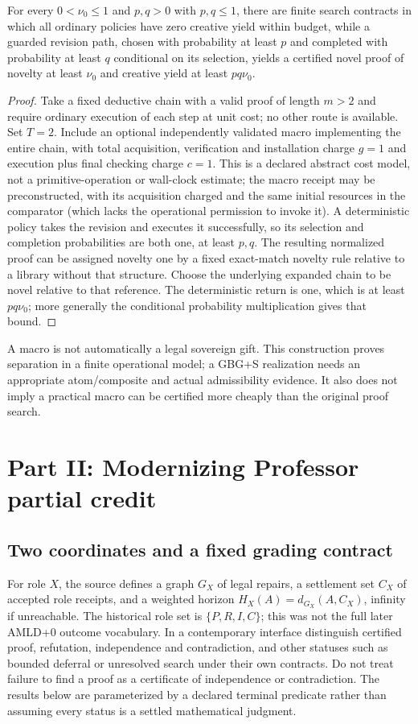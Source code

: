 \documentclass[11pt]{article}
\theoremstyle{definition}\newtheorem{definition}[theorem]{Definition}\newtheorem{conjecture}[theorem]{Conjecture}\newtheorem{example}[theorem]{Example}
\begin{document}
\begin{proposition}
For every $0<\nu_0\le1$ and $p,q>0$ with $p,q\le1$, there are finite search contracts in which all ordinary policies have zero creative yield within budget, while a guarded revision path, chosen with probability at least $p$ and completed with probability at least $q$ conditional on its selection, yields a certified novel proof of novelty at least $\nu_0$ and creative yield at least $pq\nu_0$.
\end{proposition}
\begin{proof}Take a fixed deductive chain with a valid proof of length $m>2$ and require ordinary execution of each step at unit cost; no other route is available. Set $T=2$. Include an optional independently validated macro implementing the entire chain, with total acquisition, verification and installation charge $g=1$ and execution plus final checking charge $c=1$. This is a declared abstract cost model, not a primitive-operation or wall-clock estimate; the macro receipt may be preconstructed, with its acquisition charged and the same initial resources in the comparator (which lacks the operational permission to invoke it). A deterministic policy takes the revision and executes it successfully, so its selection and completion probabilities are both one, at least $p,q$. The resulting normalized proof can be assigned novelty one by a fixed exact-match novelty rule relative to a library without that structure. Choose the underlying expanded chain to be novel relative to that reference. The deterministic return is one, which is at least $pq\nu_0$; more generally the conditional probability multiplication gives that bound.\end{proof}
A macro is not automatically a legal sovereign gift. This construction proves separation in a finite operational model; a GBG+S realization needs an appropriate atom/composite and actual admissibility evidence. It also does not imply a practical macro can be certified more cheaply than the original proof search.

\section{Part II: Modernizing Professor partial credit}
\subsection{Two coordinates and a fixed grading contract}
For role $X$, the source defines a graph $G_X$ of legal repairs, a settlement set $C_X$ of accepted role receipts, and a weighted horizon $H_X(A)=d_{G_X}(A,C_X)$, infinity if unreachable. The historical role set is $\{P,R,I,C\}$; this was not the full later AMLD+0 outcome vocabulary. In a contemporary interface distinguish certified proof, refutation, independence and contradiction, and other statuses such as bounded deferral or unresolved search under their own contracts. Do not treat failure to find a proof as a certificate of independence or contradiction. The results below are parameterized by a declared terminal predicate rather than assuming every status is a settled mathematical judgment.
\end{document}

